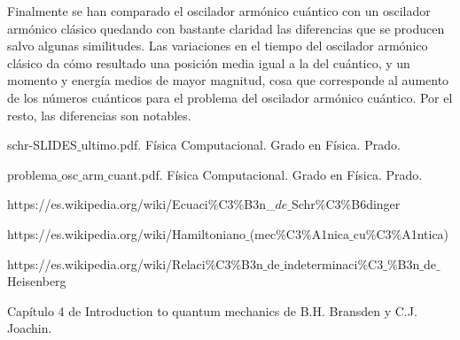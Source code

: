 \documentclass[12pt,paper]{article}
\begin{document}
Finalmente se han comparado el oscilador armónico cuántico con un oscilador armónico clásico quedando con bastante claridad las diferencias que se producen salvo algunas similitudes. Las variaciones en el tiempo del oscilador armónico clásico da cómo resultado una posición media igual a la del cuántico, y un momento y energía medios de mayor magnitud, cosa que corresponde al aumento de los números cuánticos para el problema del oscilador armónico cuántico. Por el resto, las diferencias son notables.

\newpage
\begin{thebibliography}{}

\bibitem{}
schr-SLIDES$\_$ultimo.pdf. Física Computacional. Grado en Física. Prado.

\bibitem{}
problema$\_$osc$\_$arm$\_$cuant.pdf. Física Computacional. Grado en Física. Prado.

\bibitem{}
https://es.wikipedia.org/wiki/Ecuaci$\%$C3$\%$B3n\_$de\_$Schr$\%$C3$\%$B6dinger

\bibitem{}
https://es.wikipedia.org/wiki/Hamiltoniano$\_$(mec$\%$C3$\%$A1nica$\_$cu$\%$C3$\%$A1ntica)

\bibitem{}
https://es.wikipedia.org/wiki/Relaci$\%$C3$\%$B3n$\_$de$\_$indeterminaci$\%$C3$\_$$\%$B3n$\_$de$\_$Heisenberg

\bibitem{}
Capítulo 4 de Introduction to quantum mechanics de B.H. Bransden y C.J. Joachin.

\end{thebibliography}
\end{document}

